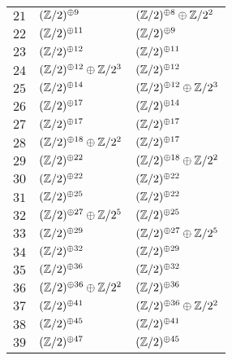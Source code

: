\documentclass[12pt,a4paper]{article}
\begin{document}
\begin{supertabular}{|c|p{5.5cm}|p{5.5cm}|}
$21$%
&$(\mathbb{Z}/2)^{\oplus9}$%
&$(\mathbb{Z}/2)^{\oplus8}\oplus\mathbb{Z}/2^{2}$\\

$22$%
&$(\mathbb{Z}/2)^{\oplus11}$%
&$(\mathbb{Z}/2)^{\oplus9}$\\

$23$%
&$(\mathbb{Z}/2)^{\oplus12}$%
&$(\mathbb{Z}/2)^{\oplus11}$\\

$24$%
&$(\mathbb{Z}/2)^{\oplus12}\oplus\mathbb{Z}/2^{3}$%
&$(\mathbb{Z}/2)^{\oplus12}$\\

$25$%
&$(\mathbb{Z}/2)^{\oplus14}$%
&$(\mathbb{Z}/2)^{\oplus12}\oplus\mathbb{Z}/2^{3}$\\

$26$%
&$(\mathbb{Z}/2)^{\oplus17}$%
&$(\mathbb{Z}/2)^{\oplus14}$\\

$27$%
&$(\mathbb{Z}/2)^{\oplus17}$%
&$(\mathbb{Z}/2)^{\oplus17}$\\

$28$%
&$(\mathbb{Z}/2)^{\oplus18}\oplus\mathbb{Z}/2^{2}$%
&$(\mathbb{Z}/2)^{\oplus17}$\\

$29$%
&$(\mathbb{Z}/2)^{\oplus22}$%
&$(\mathbb{Z}/2)^{\oplus18}\oplus\mathbb{Z}/2^{2}$\\

$30$%
&$(\mathbb{Z}/2)^{\oplus22}$%
&$(\mathbb{Z}/2)^{\oplus22}$\\

$31$%
&$(\mathbb{Z}/2)^{\oplus25}$%
&$(\mathbb{Z}/2)^{\oplus22}$\\

$32$%
&$(\mathbb{Z}/2)^{\oplus27}\oplus\mathbb{Z}/2^{5}$%
&$(\mathbb{Z}/2)^{\oplus25}$\\

$33$%
&$(\mathbb{Z}/2)^{\oplus29}$%
&$(\mathbb{Z}/2)^{\oplus27}\oplus\mathbb{Z}/2^{5}$\\

$34$%
&$(\mathbb{Z}/2)^{\oplus32}$%
&$(\mathbb{Z}/2)^{\oplus29}$\\

$35$%
&$(\mathbb{Z}/2)^{\oplus36}$%
&$(\mathbb{Z}/2)^{\oplus32}$\\

$36$%
&$(\mathbb{Z}/2)^{\oplus36}\oplus\mathbb{Z}/2^{2}$%
&$(\mathbb{Z}/2)^{\oplus36}$\\

$37$%
&$(\mathbb{Z}/2)^{\oplus41}$%
&$(\mathbb{Z}/2)^{\oplus36}\oplus\mathbb{Z}/2^{2}$\\

$38$%
&$(\mathbb{Z}/2)^{\oplus45}$%
&$(\mathbb{Z}/2)^{\oplus41}$\\

$39$%
&$(\mathbb{Z}/2)^{\oplus47}$%
&$(\mathbb{Z}/2)^{\oplus45}$\\


\end{supertabular}
\end{document}
